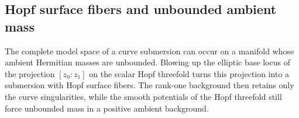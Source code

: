 \subsection{Hopf surface fibers and unbounded ambient mass}
\label{subsec:hopf-surface-fibration}

The complete model space of a curve submersion can occur on a
manifold whose ambient Hermitian masses are unbounded. Blowing
up the elliptic base locus of the projection $[z_0:z_1]$ on the
scalar Hopf threefold turns this projection into a submersion
with Hopf surface fibers. The
rank-one background then retains only the curve singularities,
while the smooth potentials of the Hopf threefold still force
unbounded mass in a positive ambient background.


